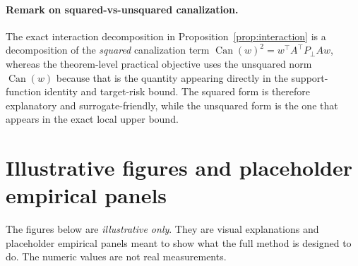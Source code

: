 \documentclass[11pt]{article}
\newcommand{\1}{\mathbf{1}}
\newcommand{\Pperp}{P_\perp}
\theoremstyle{plain}
\theoremstyle{definition}
\theoremstyle{remark}
\begin{document}
\paragraph{Remark on squared-vs-unsquared canalization.}
The exact interaction decomposition in Proposition~\ref{prop:interaction} is a decomposition of the \emph{squared} canalization term $\operatorname{Can}(w)^2=w^\top A^\top \Pperp A w$, whereas the theorem-level practical objective uses the unsquared norm $\operatorname{Can}(w)$ because that is the quantity appearing directly in the support-function identity and target-risk bound. The squared form is therefore explanatory and surrogate-friendly, while the unsquared form is the one that appears in the exact local upper bound.

\section{Illustrative figures and placeholder empirical panels}
The figures below are \emph{illustrative only}. They are visual explanations and placeholder empirical panels meant to show what the full method is designed to do. The numeric values are not real measurements.
\end{document}
